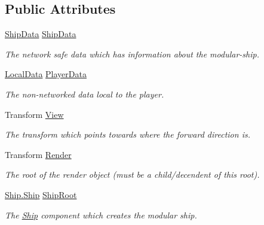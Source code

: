 \subsection*{Public Attributes}
\begin{DoxyCompactItemize}
\item 
\hyperlink{class_ship_data}{Ship\-Data} \hyperlink{class_skyrates_1_1_client_1_1_entity_1_1_entity_player_ship_ab036683fcaa1c13312a06631dfff1b42}{Ship\-Data}
\begin{DoxyCompactList}\small\item\em The network safe data which has information about the modular-\/ship. \end{DoxyCompactList}\item 
\hyperlink{class_skyrates_1_1_client_1_1_data_1_1_local_data}{Local\-Data} \hyperlink{class_skyrates_1_1_client_1_1_entity_1_1_entity_player_ship_a775f40dd5d6c89a50325eaa9dbd605b8}{Player\-Data}
\begin{DoxyCompactList}\small\item\em The non-\/networked data local to the player. \end{DoxyCompactList}\item 
Transform \hyperlink{class_skyrates_1_1_client_1_1_entity_1_1_entity_player_ship_ac31bf5882f6a5c6f53948bde1d9f0913}{View}
\begin{DoxyCompactList}\small\item\em The transform which points towards where the forward direction is. \end{DoxyCompactList}\item 
Transform \hyperlink{class_skyrates_1_1_client_1_1_entity_1_1_entity_player_ship_a47161ace6007067717ff46e5f45ec113}{Render}
\begin{DoxyCompactList}\small\item\em The root of the render object (must be a child/decendent of this root). \end{DoxyCompactList}\item 
\hyperlink{class_skyrates_1_1_client_1_1_ship_1_1_ship}{Ship.\-Ship} \hyperlink{class_skyrates_1_1_client_1_1_entity_1_1_entity_player_ship_ae5ebbb9645fe1bd175dc76bd5ae3b9a0}{Ship\-Root}
\begin{DoxyCompactList}\small\item\em The \hyperlink{namespace_skyrates_1_1_client_1_1_ship}{Ship} component which creates the modular ship. \end{DoxyCompactList}\end{DoxyCompactItemize}
